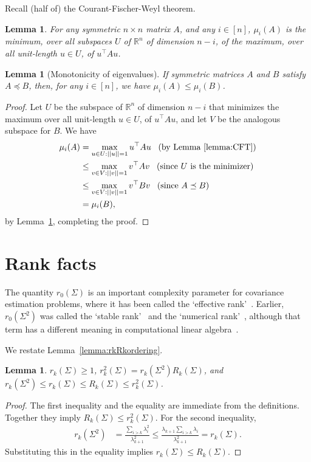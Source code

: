 \documentclass[11pt,notitlepage]{article}
\newcommand\R {\mathbb{R}}
\newtheorem{lemma}[theorem]{Lemma}
\begin{document}
Recall (half of) the Courant-Fischer-Weyl theorem.
\begin{lemma}
\label{lemma:CFT}
For any symmetric $n \times n$ matrix $A$, and any $i \in [n]$, 
$\mu_i(A)$ is 
the minimum, over all subspaces $U$ of $\R^n$
of dimension $n - i$, of the maximum, over all unit-length
$u \in U$, of $u^\top A u$.
\end{lemma}

\begin{lemma}[Monotonicity of eigenvalues]\label{lemma:monotone}
If symmetric matrices $A$ and $B$
satisfy $A\preceq B$, then, for any $i \in [n]$, we have
$\mu_i(A)\le\mu_i(B)$.
\end{lemma}
\begin{proof}
Let $U$ be the subspace of $\R^n$ of dimension $n-i$
that minimizes the maximum
over all unit-length $u \in U$, of $u^\top A u$, and
let $V$ be the analogous subspace for $B$.
We have
\begin{align*}
\mu_i(A) 
 & = \max_{u \in U: || u || = 1} u^\top A u 
          \;\;\;\mbox{(by Lemma~\ref{lemma:CFT})}
            \\
 & \leq \max_{v \in V: || v || = 1} v^\top A v 
       \;\;\;\mbox{(since $U$ is the minimizer)} \\
 & \leq \max_{v \in V: || v || = 1} v^\top B v 
       \;\;\;\mbox{(since $A \preceq B$)} \\
 & = \mu_i(B),
\end{align*}
by Lemma~\ref{lemma:CFT}, completing the proof.
\end{proof}

\section{Rank facts}\label{appendix:rankfacts}

The quantity $r_0(\Sigma)$ is an important complexity parameter
for covariance estimation problems, where it has been called the
`effective rank'~\cite{v-inaarm-12,koltchinskii2017}.  Earlier,
$r_0(\Sigma^2)$ was called the `stable rank'~\cite{rv-hwisgc-13}
and the `numerical rank'~\cite{rv-sflmagfa-07}, although that
term has a different meaning in computational linear
algebra~\cite[p261]{gvl-mc-13}.

We restate Lemma~\ref{lemma:rkRkordering}.
\begin{lemma}
  $r_k(\Sigma)\ge 1$, $r^2_k(\Sigma)=r_k(\Sigma^2)R_k(\Sigma)$, and
  $ r_k(\Sigma^2) \le r_k(\Sigma) \le R_k(\Sigma) \le r_k^2(\Sigma)$.
\end{lemma}
\begin{proof}
  The first inequality and the equality are immediate from the
  definitions. Together they imply $R_k(\Sigma) \le r_k^2(\Sigma)$.
  For the second inequality,
  \begin{align*}
    r_k(\Sigma^2)
    & = \frac{\sum_{i>k}\lambda_i^2}{\lambda_{k+1}^2}
    \le \frac{\lambda_{k+1}\sum_{i>k}\lambda_i}{\lambda_{k+1}^2}
    = r_{k}(\Sigma).
  \end{align*}
  Substituting this in the equality implies
  $r_k(\Sigma) \le R_k(\Sigma)$.
\end{proof}
\end{document}
